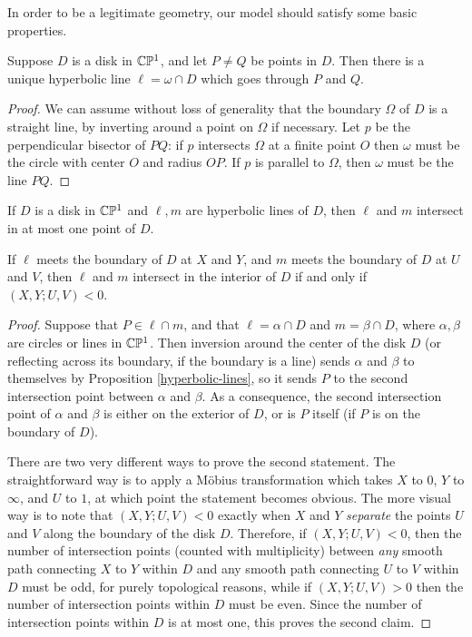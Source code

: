 In order to be a legitimate geometry, our model should satisfy some basic properties.

\begin{prop}\label{hyperbolic-lines} Suppose $D$ is a disk in $\mathbb{C}\mathbb{P}^1$, and let $P \ne Q$ be points in $D$. Then there is a unique hyperbolic line $\ell = \omega \cap D$ which goes through $P$ and $Q$.
\end{prop}
\begin{proof} We can assume without loss of generality that the boundary $\Omega$ of $D$ is a straight line, by inverting around a point on $\Omega$ if necessary. Let $p$ be the perpendicular bisector of $PQ$: if $p$ intersects $\Omega$ at a finite point $O$ then $\omega$ must be the circle with center $O$ and radius $OP$. If $p$ is parallel to $\Omega$, then $\omega$ must be the line $PQ$.
\end{proof}

\begin{prop} If $D$ is a disk in $\mathbb{C}\mathbb{P}^1$ and $\ell, m$ are hyperbolic lines of $D$, then $\ell$ and $m$ intersect in at most one point of $D$.

If $\ell$ meets the boundary of $D$ at $X$ and $Y$, and $m$ meets the boundary of $D$ at $U$ and $V$, then $\ell$ and $m$ intersect in the interior of $D$ if and only if $(X,Y;U,V) < 0$.
\end{prop}
\begin{proof} Suppose that $P \in \ell \cap m$, and that $\ell = \alpha \cap D$ and $m = \beta \cap D$, where $\alpha, \beta$ are circles or lines in $\mathbb{C}\mathbb{P}^1$. Then inversion around the center of the disk $D$ (or reflecting across its boundary, if the boundary is a line) sends $\alpha$ and $\beta$ to themselves by Proposition \ref{hyperbolic-lines}, so it sends $P$ to the second intersection point between $\alpha$ and $\beta$. As a consequence, the second intersection point of $\alpha$ and $\beta$ is either on the exterior of $D$, or is $P$ itself (if $P$ is on the boundary of $D$).

There are two very different ways to prove the second statement. The straightforward way is to apply a M\"obius transformation which takes $X$ to $0$, $Y$ to $\infty$, and $U$ to $1$, at which point the statement becomes obvious. The more visual way is to note that $(X,Y;U,V) < 0$ exactly when $X$ and $Y$ \emph{separate} the points $U$ and $V$ along the boundary of the disk $D$. Therefore, if $(X,Y;U,V) < 0$, then the number of intersection points (counted with multiplicity) between \emph{any} smooth path connecting $X$ to $Y$ within $D$ and any smooth path connecting $U$ to $V$ within $D$ must be odd, for purely topological reasons, while if $(X,Y;U,V) > 0$ then the number of intersection points within $D$ must be even. Since the number of intersection points within $D$ is at most one, this proves the second claim.
\end{proof}

